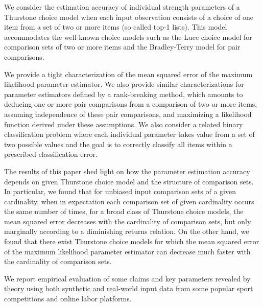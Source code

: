 We consider the estimation accuracy of individual strength parameters of a Thurstone choice model when each input observation consists of a choice of one item from a set of two or more items (so called top-1 lists). This model accommodates the well-known choice models such as the Luce choice model for comparison sets of two or more items and the Bradley-Terry model for pair comparisons.   

We provide a tight characterization of the mean squared error of the maximum likelihood parameter estimator. We also provide similar characterizations for parameter estimators defined by a rank-breaking method, which amounts to deducing one or more pair comparisons from a comparison of two or more items, assuming independence of these pair comparisons, and maximizing a likelihood function derived under these assumptions. We also consider a related binary classification problem where each individual parameter takes value from a set of two possible values and the goal is to correctly classify all items within a prescribed classification error. 

The results of this paper shed light on how the parameter estimation accuracy depends on given Thurstone choice model and the structure of comparison sets. In particular, we found that for unbiased input comparison sets of a given cardinality, when in expectation each comparison set of given cardinality occurs the same number of times, for a broad class of Thurstone choice models, the mean squared error decreases with the cardinality of comparison sets, but only marginally according to a diminishing returns relation. On the other hand, we found that there exist Thurstone choice models for which the mean squared error of the maximum likelihood parameter estimator can decrease much faster with the cardinality of comparison sets. 

We report empirical evaluation of some claims and key parameters revealed by theory using both synthetic and real-world input data from some popular sport competitions and online labor platforms.